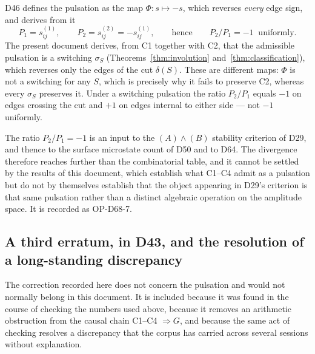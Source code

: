 \documentclass[11pt,a4paper]{article}
\begin{document}
D46 defines the pulsation as the map $\Phi:s\mapsto-s$, which reverses \emph{every} edge sign, and derives from it
\[
P_1=s^{(1)}_{ij},\qquad P_2=s^{(2)}_{ij}=-s^{(1)}_{ij},\qquad\text{hence}\qquad P_2/P_1=-1 \ \text{ uniformly}.
\]
The present document derives, from C1 together with C2, that the admissible pulsation is a switching $\sigma_S$ (Theorems~\ref{thm:involution} and~\ref{thm:classification}), which reverses only the edges of the cut $\delta(S)$. These are different maps: $\Phi$ is not a switching for any $S$, which is precisely why it fails to preserve C2, whereas every $\sigma_S$ preserves it. Under a switching pulsation the ratio $P_2/P_1$ equals $-1$ on edges crossing the cut and $+1$ on edges internal to either side --- not $-1$ uniformly.

The ratio $P_2/P_1=-1$ is an input to the $(A)\wedge(B)$ stability criterion of D29, and thence to the surface microstate count of D50 and to D64. The divergence therefore reaches further than the combinatorial table, and it cannot be settled by the results of this document, which establish what C1--C4 admit as a pulsation but do not by themselves establish that the object appearing in D29's criterion is that same pulsation rather than a distinct algebraic operation on the amplitude space. It is recorded as OP-D68-7.

\subsection{A third erratum, in D43, and the resolution of a long-standing discrepancy}
\label{subsec:D43}

The correction recorded here does not concern the pulsation and would not normally belong in this document. It is included because it was found in the course of checking the numbers used above, because it removes an arithmetic obstruction from the causal chain C1--C4 $\Rightarrow G$, and because the same act of checking resolves a discrepancy that the corpus has carried across several sessions without explanation.
\end{document}
